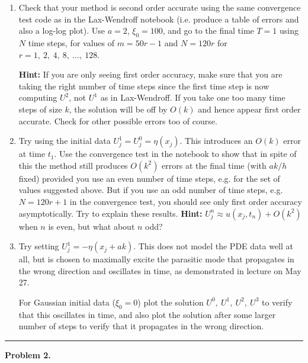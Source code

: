 \documentclass[10pt]{article}
\begin{document}
\begin{enumerate} 
\item Check that your method is second order accurate using the same
convergence test code as in the Lax-Wendroff notebook (i.e. produce a table
of errors and also a log-log plot).  
Use $a=2$, $\xi_0=100$, and go to the final time $T=1$ using $N$ time steps, for 
values of $m = 50r -1$ and $N=120r$ for $r = 1,~2,~4,~8,~\ldots,~128$.

{\bf Hint:} If you are only seeing
first order accuracy, make sure that you are taking the right number of time
steps since the first time step is now computing $U^2$, not $U^1$ as in
Lax-Wendroff.  If you take one too many time steps of size $k$, 
the solution will be off
by $O(k)$ and hence appear first order accurate.  Check for other possible
errors too of course.

\item Try using the initial data $U_j^1 = U_j^0 = \eta(x_j)$.  This
introduces an $O(k)$ error at time $t_1$.  Use the convergence test in the
notebook to show that in spite of this the method still produces
$O(k^2)$ errors at the final time (with $ak/h$ fixed) provided you use an
even number of time steps,  e.g. for the set of values suggested above.
But if you use an odd number of time steps, e.g. $N = 120r +1$ in
the convergence test, you should see only first order accuracy
asymptotically.   Try to explain these results.
{\bf Hint:} $U_j^n \approx u(x_j,t_n) + O(k^2)$ when $n$ is even, but what
about $n$ odd?

\newpage

\item Try setting $U_j^1 = -\eta(x_j + ak)$.  This does not model the PDE data
well at all, but is chosen to maximally excite the parasitic mode that
propagates in the wrong direction and oscillates in time, as demonstrated in
lecture on May 27.  

For Gaussian initial data ($\xi_0=0$) plot the solution
$U^0,~U^1,~U^2,~U^3$ to verify that this oscillates in time, and also plot the
solution after some larger number of steps to verify that it propagates in the
wrong direction.

\end{enumerate} 






\vskip 1cm
\hrule
{\bf Problem 2.}  
\end{document}
